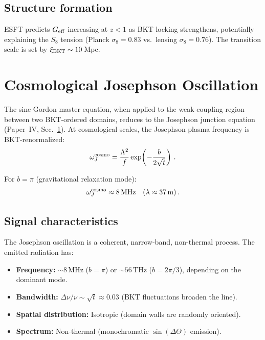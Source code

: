 \documentclass[twocolumn,preprintnumbers,amsmath,amssymb,prd]{revtex4-2}
\begin{document}
\subsection{Structure formation}

ESFT predicts $G_{\rm eff}$ increasing at $z < 1$ as BKT locking strengthens, potentially explaining the $S_8$ tension (Planck $\sigma_8 = 0.83$ vs.\ lensing $\sigma_8 = 0.76$).
The transition scale is set by $\xi_{\rm BKT} \sim 10\,$Mpc.

\section{Cosmological Josephson Oscillation}
\label{sec:josephson}

The sine-Gordon master equation, when applied to the weak-coupling region between two BKT-ordered domains, reduces to the Josephson junction equation (Paper~IV, Sec.~\ref{sec:josephson}). At cosmological scales, the Josephson plasma frequency is BKT-renormalized:
\begin{equation}
\omega_J^{\rm cosmo} = \frac{\Lambda^2}{f}\exp\!\left(-\frac{b}{2\sqrt{t}}\right)\,.
\label{eq:omega_J_cosmo}
\end{equation}

For $b = \pi$ (gravitational relaxation mode):
\begin{equation}
\omega_J^{\rm cosmo} \approx 8\,{\rm MHz} \quad (\lambda \approx 37\,{\rm m})\,.
\end{equation}

\subsection{Signal characteristics}

The Josephson oscillation is a coherent, narrow-band, non-thermal process. The emitted radiation has:
\begin{itemize}
\item \textbf{Frequency:} $\sim 8\,$MHz ($b = \pi$) or $\sim 56\,$THz ($b = 2\pi/3$), depending on the dominant mode.
\item \textbf{Bandwidth:} $\Delta\nu/\nu \sim \sqrt{t} \approx 0.03$ (BKT fluctuations broaden the line).
\item \textbf{Spatial distribution:} Isotropic (domain walls are randomly oriented).
\item \textbf{Spectrum:} Non-thermal (monochromatic $\sin(\Delta\Theta)$ emission).
\end{itemize}
\end{document}

